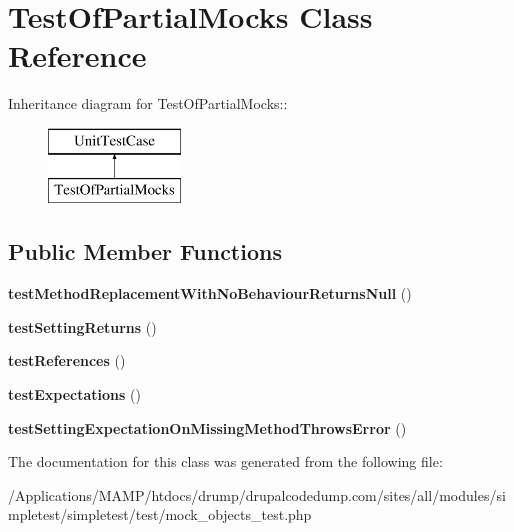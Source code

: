 \hypertarget{class_test_of_partial_mocks}{
\section{TestOfPartialMocks Class Reference}
\label{class_test_of_partial_mocks}
}
Inheritance diagram for TestOfPartialMocks::\begin{figure}[H]
\begin{center}
\leavevmode
\includegraphics[height=2cm]{class_test_of_partial_mocks}
\end{center}
\end{figure}
\subsection*{Public Member Functions}
\begin{DoxyCompactItemize}
\item 
\hypertarget{class_test_of_partial_mocks_a11a207f8bcb67f07a1975119e60c5816}{
{\bfseries testMethodReplacementWithNoBehaviourReturnsNull} ()}
\label{class_test_of_partial_mocks_a11a207f8bcb67f07a1975119e60c5816}

\item 
\hypertarget{class_test_of_partial_mocks_a6ec08f756c6f51ca1ccf4df8d9e2f420}{
{\bfseries testSettingReturns} ()}
\label{class_test_of_partial_mocks_a6ec08f756c6f51ca1ccf4df8d9e2f420}

\item 
\hypertarget{class_test_of_partial_mocks_ab3e5501c7ef3fbc6b9e3ca0b8500e2d0}{
{\bfseries testReferences} ()}
\label{class_test_of_partial_mocks_ab3e5501c7ef3fbc6b9e3ca0b8500e2d0}

\item 
\hypertarget{class_test_of_partial_mocks_a361f6851c6e5d18a88293c43cd382c5f}{
{\bfseries testExpectations} ()}
\label{class_test_of_partial_mocks_a361f6851c6e5d18a88293c43cd382c5f}

\item 
\hypertarget{class_test_of_partial_mocks_ae2c4b379497e17031f93ab6ae1f8c234}{
{\bfseries testSettingExpectationOnMissingMethodThrowsError} ()}
\label{class_test_of_partial_mocks_ae2c4b379497e17031f93ab6ae1f8c234}

\end{DoxyCompactItemize}


The documentation for this class was generated from the following file:\begin{DoxyCompactItemize}
\item 
/Applications/MAMP/htdocs/drump/drupalcodedump.com/sites/all/modules/simpletest/simpletest/test/mock\_\-objects\_\-test.php\end{DoxyCompactItemize}
